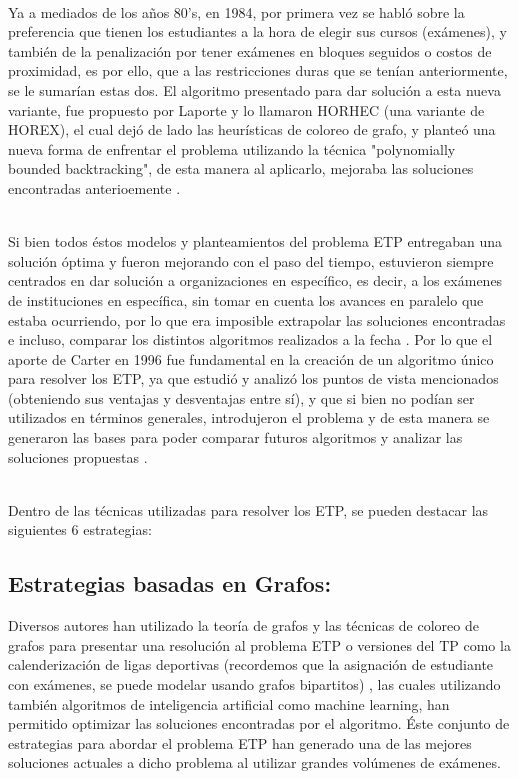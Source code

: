 \documentclass[letter, 10pt]{article}
\begin{document}
\begin{itemize}
\end{itemize}
\\
Ya a mediados de los años 80's, en 1984, por primera vez se habló sobre la preferencia que tienen los estudiantes a la hora de elegir sus cursos (exámenes), y también de la penalización por tener exámenes en bloques seguidos o costos de proximidad, es por ello, que a las restricciones duras que se tenían anteriormente, se le sumarían estas dos. El algoritmo presentado para dar solución a esta nueva variante, fue propuesto por Laporte y lo llamaron HORHEC (una variante de HOREX), el cual dejó de lado las heurísticas de coloreo de grafo, y planteó una nueva forma de enfrentar el problema utilizando la técnica "polynomially bounded
backtracking", de esta manera al aplicarlo, mejoraba las soluciones encontradas anterioemente \cite{Cita13}.
\begin{itemize}
\end{itemize}
\\
Si bien todos éstos modelos y planteamientos del problema ETP entregaban una solución óptima y fueron mejorando con el paso del tiempo, estuvieron siempre centrados en dar solución a organizaciones en específico, es decir, a los exámenes de instituciones en específica, sin tomar en cuenta los avances en paralelo que estaba ocurriendo, por lo que era imposible extrapolar las soluciones encontradas e incluso, comparar los distintos algoritmos realizados a la fecha \cite{Cita14}. Por lo que el aporte de Carter en 1996 fue fundamental en la creación de un algoritmo único para resolver los ETP, ya que estudió y analizó los puntos de vista mencionados (obteniendo sus ventajas y desventajas entre sí), y que si bien no podían ser utilizados en términos generales, introdujeron el problema y de esta manera se generaron las bases para poder comparar futuros algoritmos y analizar las soluciones propuestas \cite{Cita15}. 
\begin{itemize}
\end{itemize}
\\
Dentro de las técnicas utilizadas para resolver los ETP, se pueden destacar las siguientes 6 estrategias:

\subsection{Estrategias basadas en Grafos:}
Diversos autores han utilizado la teoría de grafos y las técnicas de coloreo de grafos para presentar una resolución al problema ETP o versiones del TP como la calenderización de ligas deportivas (recordemos que la asignación de estudiante con exámenes, se puede modelar usando grafos bipartitos) \cite{Cita16}, las cuales utilizando también algoritmos de inteligencia artificial como machine learning, han permitido optimizar las soluciones encontradas por el algoritmo. Éste conjunto de estrategias para abordar el problema ETP han generado una de las mejores soluciones actuales a dicho problema al utilizar grandes volúmenes de exámenes.
\end{document}
